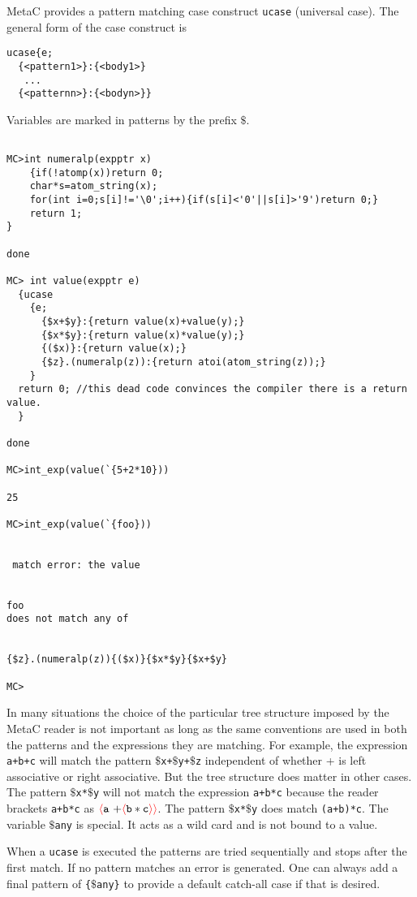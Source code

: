 \documentclass{article}
\newcommand{\fopen}{{\color{red} \langle}}
\newcommand{\fclose}{{\color{red} \rangle}}
\begin{document}
MetaC provides a pattern matching case construct {\tt ucase} (universal case).
The general form of the case construct is

\begin{verbatim}
ucase{e;
  {<pattern1>}:{<body1>}
   ...
  {<patternn>}:{<bodyn>}}
\end{verbatim}

Variables are marked in patterns by the prefix $\$$.

\begin{verbatim}

MC>int numeralp(expptr x)
    {if(!atomp(x))return 0;
    char*s=atom_string(x);
    for(int i=0;s[i]!='\0';i++){if(s[i]<'0'||s[i]>'9')return 0;}
    return 1;
}

done

MC> int value(expptr e)
  {ucase
    {e;
      {$x+$y}:{return value(x)+value(y);}
      {$x*$y}:{return value(x)*value(y);}
      {($x)}:{return value(x);}
      {$z}.(numeralp(z)):{return atoi(atom_string(z));}
    }
  return 0; //this dead code convinces the compiler there is a return value.
  }

done

MC>int_exp(value(`{5+2*10}))

25

MC>int_exp(value(`{foo}))


 match error: the value 


foo
does not match any of


{$z}.(numeralp(z)){($x)}{$x*$y}{$x+$y}

MC>
\end{verbatim}

In many situations the choice of the particular tree structure imposed by the MetaC reader is not important as long as the same conventions are used in both the patterns and the expressions
they are matching.  For example, the expression {\tt a+b+c} will match the pattern
{\tt $\$$x+$\$$y+$\$$z} independent of whether + is left associative or right associative.  But the tree structure does matter in other cases.  The pattern {\tt $\$$x*$\$$y}
will not match the expression {\tt a+b*c} because the reader brackets {\tt a+b*c} as  $\fopen \mathtt{a~+} \fopen \mathtt{b * c} \fclose\fclose$. The pattern {\tt $\$$x*$\$$y} does match {\tt (a+b)*c}.
The variable {\tt $\$$any} is special.  It acts as a wild card and is not bound to a value.

When a {\tt ucase} is executed the patterns are tried sequentially and stops after the first match.  If no pattern matches an error is generated.
One can always add a final pattern of {\tt \{$\$$any\}} to provide a default
catch-all case if that is desired.
\end{document}
